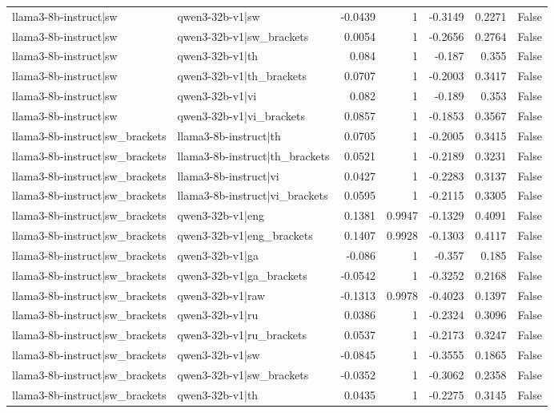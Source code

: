\begin{table}
\begin{tabular}{l l r r r r l}
llama3-8b-instruct|sw & qwen3-32b-v1|sw & -0.0439 & 1 & -0.3149 & 0.2271 & False \\
llama3-8b-instruct|sw & qwen3-32b-v1|sw_brackets & 0.0054 & 1 & -0.2656 & 0.2764 & False \\
llama3-8b-instruct|sw & qwen3-32b-v1|th & 0.084 & 1 & -0.187 & 0.355 & False \\
llama3-8b-instruct|sw & qwen3-32b-v1|th_brackets & 0.0707 & 1 & -0.2003 & 0.3417 & False \\
llama3-8b-instruct|sw & qwen3-32b-v1|vi & 0.082 & 1 & -0.189 & 0.353 & False \\
llama3-8b-instruct|sw & qwen3-32b-v1|vi_brackets & 0.0857 & 1 & -0.1853 & 0.3567 & False \\
llama3-8b-instruct|sw_brackets & llama3-8b-instruct|th & 0.0705 & 1 & -0.2005 & 0.3415 & False \\
llama3-8b-instruct|sw_brackets & llama3-8b-instruct|th_brackets & 0.0521 & 1 & -0.2189 & 0.3231 & False \\
llama3-8b-instruct|sw_brackets & llama3-8b-instruct|vi & 0.0427 & 1 & -0.2283 & 0.3137 & False \\
llama3-8b-instruct|sw_brackets & llama3-8b-instruct|vi_brackets & 0.0595 & 1 & -0.2115 & 0.3305 & False \\
llama3-8b-instruct|sw_brackets & qwen3-32b-v1|eng & 0.1381 & 0.9947 & -0.1329 & 0.4091 & False \\
llama3-8b-instruct|sw_brackets & qwen3-32b-v1|eng_brackets & 0.1407 & 0.9928 & -0.1303 & 0.4117 & False \\
llama3-8b-instruct|sw_brackets & qwen3-32b-v1|ga & -0.086 & 1 & -0.357 & 0.185 & False \\
llama3-8b-instruct|sw_brackets & qwen3-32b-v1|ga_brackets & -0.0542 & 1 & -0.3252 & 0.2168 & False \\
llama3-8b-instruct|sw_brackets & qwen3-32b-v1|raw & -0.1313 & 0.9978 & -0.4023 & 0.1397 & False \\
llama3-8b-instruct|sw_brackets & qwen3-32b-v1|ru & 0.0386 & 1 & -0.2324 & 0.3096 & False \\
llama3-8b-instruct|sw_brackets & qwen3-32b-v1|ru_brackets & 0.0537 & 1 & -0.2173 & 0.3247 & False \\
llama3-8b-instruct|sw_brackets & qwen3-32b-v1|sw & -0.0845 & 1 & -0.3555 & 0.1865 & False \\
llama3-8b-instruct|sw_brackets & qwen3-32b-v1|sw_brackets & -0.0352 & 1 & -0.3062 & 0.2358 & False \\
llama3-8b-instruct|sw_brackets & qwen3-32b-v1|th & 0.0435 & 1 & -0.2275 & 0.3145 & False \\

\end{tabular}
\end{table}
